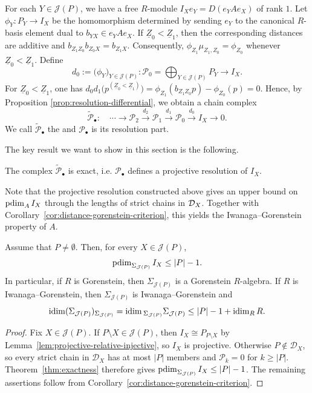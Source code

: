 \documentclass[a4paper,leqno]{amsart}
\begin{document}
For each $Y\in\mathcal J(P)$, we have a free $R$-module $I_Xe_Y=D(e_YAe_X)$ of rank $1$.  Let $\phi_Y\colon P_Y\to I_X$ be the homomorphism determined by sending $e_Y$ to the canonical $R$-basis element dual to $b_{YX}\in e_YAe_X$. If $\underline{Z}_0<\underline{Z}_1$, then the corresponding distances are additive and $b_{Z_1Z_0}b_{Z_0X}=b_{Z_1X}$.  Consequently, $\phi_{Z_1}\mu_{Z_1,Z_0}=\phi_{Z_0}$ whenever $\underline{Z}_0<\underline{Z}_1$. Define
\[
 d_0:=\bigl(\phi_Y\bigr)_{Y\in\mathcal J(P)}\colon\mathcal P_0=\bigoplus_{Y\in\mathcal J(P)}P_Y\longrightarrow I_X.
\]
For \(\underline{Z}_0<\underline{Z}_1\), one has $d_0d_1\bigl(p^{(\underline{Z}_0<\underline{Z}_1)}\bigr)=\phi_{Z_1}(b_{Z_1Z_0}p)-\phi_{Z_0}(p)=0$. Hence, by Proposition \ref{prop:resolution-differential}, we obtain a chain complex
\begin{equation}
 \widetilde{\mathcal{P}}_\bullet: \quad \cdots\longrightarrow\mathcal P_2\xrightarrow{d_2}\mathcal P_1\xrightarrow{d_1}\mathcal P_0\xrightarrow{d_0}I_X\longrightarrow0.
 \label{eq:candidate-complex}
\end{equation}
We call $\widetilde{\mathcal P}_\bullet$ the  and $\mathcal{P}_\bullet$ is its resolution part.

The key result we want to show in this section is the following.
\begin{thm}\label{thm:exactness}
The complex $\widetilde{\mathcal{P}}_\bullet$ is exact, i.e. $\mathcal{P}_\bullet$ defines a projective resolution of $I_X$.
\end{thm}

Note that the projective resolution constructed above gives an upper bound on $\operatorname{pdim}_A I_X$ through the lengths of strict chains in $\mathcal D_X$. Together with Corollary~\ref{cor:distance-gorenstein-criterion}, this yields the Iwanaga--Gorenstein property of $A$.

\begin{cor}\label{cor:distributive-ig}
Assume that $P\neq\emptyset$. Then, for every $X\in\mathcal J(P)$,
\[
\operatorname{pdim}_{\Sigma_{\mathcal J(P)}}I_X\leq |P|-1.
\]
In particular, if $R$ is Gorenstein, then $\Sigma_{\mathcal J(P)}$ is a Gorenstein $R$-algebra. If $R$ is Iwanaga--Gorenstein, then $\Sigma_{\mathcal J(P)}$ is Iwanaga--Gorenstein and
\[
\operatorname{idim}(\Sigma_{\mathcal J(P)})_{\Sigma_{\mathcal J(P)}}
=\operatorname{idim}{}_{\Sigma_{\mathcal J(P)}}\Sigma_{\mathcal J(P)}
\leq |P|-1+\operatorname{idim}_R R.
\]
\end{cor}

\begin{proof}
Fix $X\in\mathcal J(P)$. If $P\setminus X\in\mathcal J(P)$, then $I_X\cong P_{P\setminus X}$ by Lemma~\ref{lem:projective-relative-injective}, so $I_X$ is projective. Otherwise $P\notin\mathcal D_X$, so every strict chain in $\mathcal D_X$ has at most $|P|$ members and $\mathcal P_k=0$ for $k\geq|P|$. Theorem~\ref{thm:exactness} therefore gives $\operatorname{pdim}_{\Sigma_{\mathcal J(P)}}I_X\leq|P|-1$. The remaining assertions follow from Corollary~\ref{cor:distance-gorenstein-criterion}.
\end{proof}
\end{document}
